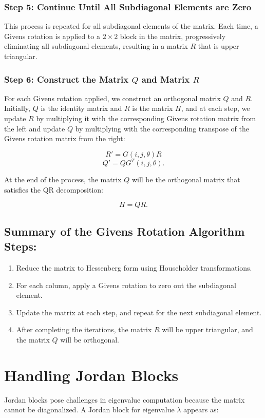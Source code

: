 \documentclass[12pt]{article}
\begin{document}
\subsubsection{Step 5: Continue Until All Subdiagonal Elements are Zero}
This process is repeated for all subdiagonal elements of the matrix. Each time, a Givens rotation is applied to a \( 2 \times 2 \) block in the matrix, progressively eliminating all subdiagonal elements, resulting in a matrix \( R \) that is upper triangular.

\subsubsection{Step 6: Construct the Matrix \( Q \) and Matrix \( R \)}
For each Givens rotation applied, we construct an orthogonal matrix \( Q \) and \( R \). Initially, \( Q \) is the identity matrix and \( R \) is the matrix \( H \), and at each step, we update \( R \) by multiplying it with the corresponding Givens rotation matrix from the left and update \( Q \) by multiplying with the corresponding transpose of the Givens rotation matrix from the right:

\[
R' = G(i, j, \theta) R
\] 
\[ 
Q' = Q G^{T}(i, j, \theta).
\]

At the end of the process, the matrix \( Q \) will be the orthogonal matrix that satisfies the QR decomposition:

\[
H = Q R.
\]

\subsection{Summary of the Givens Rotation Algorithm Steps:}
\begin{enumerate}
    \item Reduce the matrix to Hessenberg form using Householder transformations.
    \item For each column, apply a Givens rotation to zero out the subdiagonal element.
    \item Update the matrix at each step, and repeat for the next subdiagonal element.
    \item After completing the iterations, the matrix \( R \) will be upper triangular, and the matrix \( Q \) will be orthogonal.
\end{enumerate}

\section{Handling Jordan Blocks}
Jordan blocks pose challenges in eigenvalue computation because the matrix cannot be diagonalized. A Jordan block for eigenvalue \(\lambda\) appears as:
\end{document}
